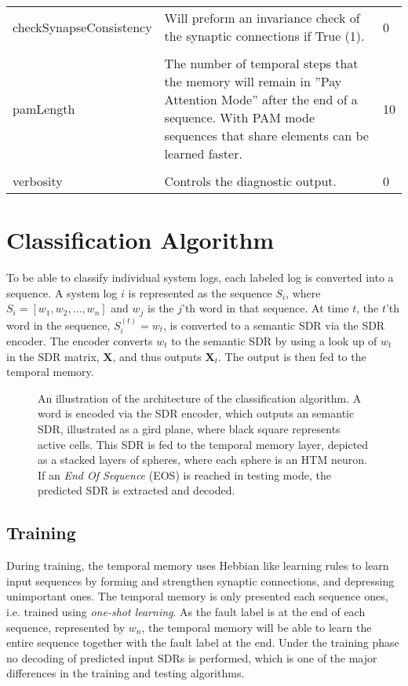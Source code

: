 \begin{table}[H]
\begin{tabularx}{\textwidth}{l p{7.5cm} l}
        checkSynapseConsistency & Will preform an invariance check of the synaptic connections if True (1). & 0\\
        &&\\
        pamLength & The number of temporal steps that the memory will remain in ''Pay Attention Mode'' after the end of a sequence. With PAM mode sequences that share elements can be learned faster. & 10\\
        &&\\
        verbosity & Controls the diagnostic output. & 0 \\
\bottomrule
\end{tabularx}
\end{table}





\section{Classification Algorithm}
To be able to classify individual system logs, each labeled log is converted into a sequence. A system log $i$ is represented as the sequence $S_i$, where $S_i = [w_1, w_2, \hdots, w_n]$ and $w_j$ is the $j$'th word in that sequence. At time $t$, the $t$'th word in the sequence, $S_i^{(t)}=w_t$, is converted to a semantic SDR via the SDR encoder. The encoder converts $w_t$ to the semantic SDR by using a look up of $w_t$ in the SDR matrix, $\boldsymbol{X}$, and thus outputs $\boldsymbol{X}_t$. The output is then fed to the temporal memory. 

\begin{figure}[H]
    \centering
    \scalebox{.5}{}
    \caption{An illustration of the architecture of the classification algorithm. A word is encoded via the SDR encoder, which outputs an semantic SDR, illustrated as a gird plane, where black square represents active cells. This SDR is fed to the temporal memory layer, depicted as a stacked layers of spheres, where each sphere is an HTM neuron. If an \textit{End Of Sequence} (EOS) is reached in testing mode, the predicted SDR is extracted and decoded.}
    \label{fig:clfalg}
\end{figure}


\subsection{Training}
During training, the temporal memory uses Hebbian like learning rules to learn input sequences by forming and strengthen synaptic connections, and depressing unimportant ones. The temporal memory is only presented each sequence ones, i.e. trained using \textit{one-shot learning}. As the fault label is at the end of each sequence, represented by $w_n$, the temporal memory will be able to learn the entire sequence together with the fault label at the end. Under the training phase no decoding of predicted input SDRs is performed, which is one of the major differences in the training and testing algorithms. 


